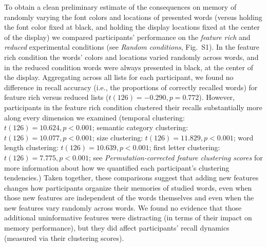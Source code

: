 \documentclass[11pt]{article}
\newcommand{\dynamicsRandom}{S1}
\begin{document}
To obtain a clean preliminary estimate of the consequences on memory of
randomly varying the font colors and locations of presented words (versus
holding the font color fixed at black, and holding the display locations fixed
at the center of the display) we compared participants' performance on the
\textit{feature rich} and \textit{reduced} experimental conditions (see
\textit{Random conditions}, Fig.~\dynamicsRandom). In the feature rich
condition the words' colors and locations varied randomly across words, and in
the reduced condition words were always presented in black, at the center of
the display. Aggregating across all lists for each participant, we found no
difference in recall accuracy (i.e., the proportions of correctly recalled
words) for feature rich versus reduced lists ($t(126) = -0.290, p = 0.772$).
However, participants in the feature rich condition clustered their recalls
substantially more along every dimension we examined (temporal clustering:
$t(126) = 10.624, p < 0.001$; semantic category clustering: $t(126) = 10.077, p
< 0.001$; size clustering: $t(126) = 11.829, p < 0.001$; word length
clustering: $t(126) = 10.639, p < 0.001$; first letter clustering: $t(126) =
7.775, p < 0.001$; see \textit{Permutation-corrected feature clustering scores}
for more information about how we quantified each participant's clustering
tendencies.) Taken together, these comparisons suggest that adding new features
changes how participants organize their memories of studied words, even when
those new features are independent of the words themselves and even when the
new features vary randomly across words. We found no evidence that those
additional uninformative features were distracting (in terms of their impact on
memory performance), but they did affect participants' recall dynamics
(measured via their clustering scores).
\end{document}
